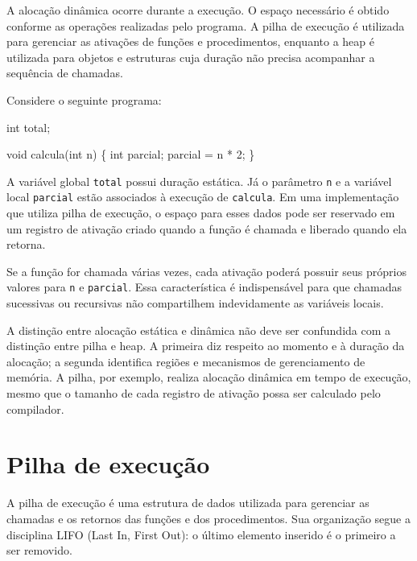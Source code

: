 \documentclass[
  brazilian,
  letterpaper,
]{book}
\newenvironment{Shaded}{\begin{snugshade}}{\end{snugshade}}
\newcommand{\DataTypeTok}[1]{\textcolor[rgb]{0.68,0.00,0.00}{#1}}
\newcommand{\DecValTok}[1]{\textcolor[rgb]{0.68,0.00,0.00}{#1}}
\newcommand{\NormalTok}[1]{\textcolor[rgb]{0.00,0.23,0.31}{#1}}
\newcommand{\OperatorTok}[1]{\textcolor[rgb]{0.37,0.37,0.37}{#1}}
\theoremstyle{plain}
\theoremstyle{definition}
\theoremstyle{remark}
\begin{document}
A alocação dinâmica ocorre durante a execução. O espaço necessário é
obtido conforme as operações realizadas pelo programa. A pilha de
execução é utilizada para gerenciar as ativações de funções e
procedimentos, enquanto a heap é utilizada para objetos e estruturas
cuja duração não precisa acompanhar a sequência de chamadas.

Considere o seguinte programa:

\begin{Shaded}
\begin{Highlighting}[]
\DataTypeTok{int}\NormalTok{ total}\OperatorTok{;}

\DataTypeTok{void}\NormalTok{ calcula}\OperatorTok{(}\DataTypeTok{int}\NormalTok{ n}\OperatorTok{)} \OperatorTok{\{}
    \DataTypeTok{int}\NormalTok{ parcial}\OperatorTok{;}
\NormalTok{    parcial }\OperatorTok{=}\NormalTok{ n }\OperatorTok{*} \DecValTok{2}\OperatorTok{;}
\OperatorTok{\}}
\end{Highlighting}
\end{Shaded}

A variável global \texttt{total} possui duração estática. Já o parâmetro
\texttt{n} e a variável local \texttt{parcial} estão associados à
execução de \texttt{calcula}. Em uma implementação que utiliza pilha de
execução, o espaço para esses dados pode ser reservado em um registro de
ativação criado quando a função é chamada e liberado quando ela retorna.

Se a função for chamada várias vezes, cada ativação poderá possuir seus
próprios valores para \texttt{n} e \texttt{parcial}. Essa característica
é indispensável para que chamadas sucessivas ou recursivas não
compartilhem indevidamente as variáveis locais.

A distinção entre alocação estática e dinâmica não deve ser confundida
com a distinção entre pilha e heap. A primeira diz respeito ao momento e
à duração da alocação; a segunda identifica regiões e mecanismos de
gerenciamento de memória. A pilha, por exemplo, realiza alocação
dinâmica em tempo de execução, mesmo que o tamanho de cada registro de
ativação possa ser calculado pelo compilador.

\section{Pilha de execução}\label{pilha-de-execuuxe7uxe3o}

A pilha de execução é uma estrutura de dados utilizada para gerenciar as
chamadas e os retornos das funções e dos procedimentos. Sua organização
segue a disciplina LIFO (Last In, First Out): o último elemento inserido
é o primeiro a ser removido.
\end{document}
